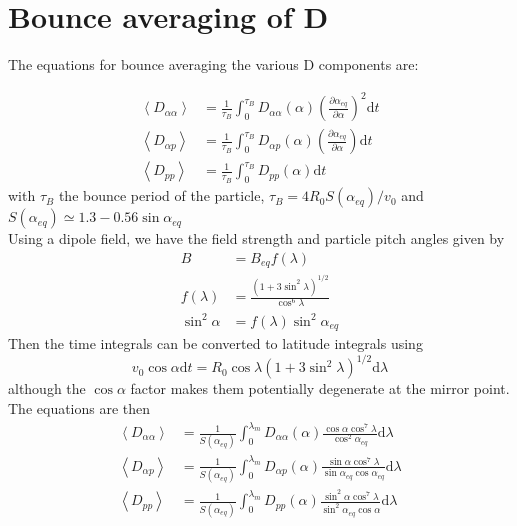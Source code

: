 \documentclass[]{article}
\begin{document}
\section{Bounce averaging of D}
The equations for bounce averaging the various D components are:

\begin{align}\label{Bounce_time}
\left< D_{\alpha \alpha}\right> &=\frac{1}{\tau_B} \int_0^{\tau_B} D_{\alpha \alpha}(\alpha) \left(\frac{\partial \alpha_{eq}}{\partial \alpha}\right)^2 \mathrm{d}t\\
\left< D_{\alpha p}\right> &=\frac{1}{\tau_B} \int_0^{\tau_B} D_{\alpha p}(\alpha) \left(\frac{\partial \alpha_{eq}}{\partial \alpha}\right) \mathrm{d}t\\
\left< D_{p p}\right> &=\frac{1}{\tau_B} \int_0^{\tau_B} D_{p p}(\alpha) \mathrm{d}t
\end{align}
with $\tau_B$ the bounce period of the particle, $\tau_B = 4 R_0 S(\alpha_{eq})/v_0$ and $S(\alpha_{eq}) \simeq 1.3 - 0.56 \sin\alpha_{eq}$
\\Using a dipole field, we have the field strength and particle pitch angles given by
\begin{align}
B &= B_{eq} f(\lambda)\\
f(\lambda) &= \frac{(1+3\sin^2\lambda)^{1/2}}{\cos^6\lambda}\label{bounce_f}\\
\sin^2\alpha &= f(\lambda) \sin^2\alpha_{eq}\label{bounce_f2}
\end{align}
Then the time integrals can be converted to latitude integrals using
\begin{equation}
v_0 \cos \alpha \mathrm{d} t = R_0 \cos \lambda (1+3\sin^2\lambda)^{1/2} \mathrm{d}\lambda
\end{equation}
although the $\cos \alpha$ factor makes them potentially degenerate at the mirror point. The equations are then
\begin{align}\label{Bounce_lam}
\left< D_{\alpha \alpha}\right> &=\frac{1}{S(\alpha_{eq})} \int_0^{\lambda_m} D_{\alpha \alpha}(\alpha) \frac{\cos \alpha \cos^7\lambda}{\cos^2\alpha_{eq}} \mathrm{d}\lambda\\
\left< D_{\alpha p}\right> &=\frac{1}{S(\alpha_{eq})} \int_0^{\lambda_m} D_{\alpha p}(\alpha) \frac{\sin \alpha \cos^7\lambda}{\sin \alpha_{eq}\cos\alpha_{eq}} \mathrm{d}\lambda\\
\left< D_{p p}\right> &=\frac{1}{S(\alpha_{eq})} \int_0^{\lambda_m} D_{p p}(\alpha) \frac{\sin^2 \alpha \cos^7\lambda}{\sin^2 \alpha_{eq}\cos\alpha} \mathrm{d}\lambda
\end{align}
\end{document}
